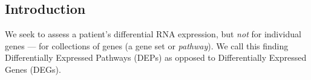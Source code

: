 \documentclass[a0,portrait]{a0poster}
\begin{document}
\begin{multicols}{3} %

 
  

\color{Black} %
\section{Introduction}

We seek to assess a patient's differential RNA expression, but \textit{not} for individual genes --- for collections of genes (a gene set or \textit{pathway}). We call this finding Differentially Expressed Pathways (DEPs) as opposed to Differentially Expressed Genes (DEGs). 


\end{multicols}
\end{document}
